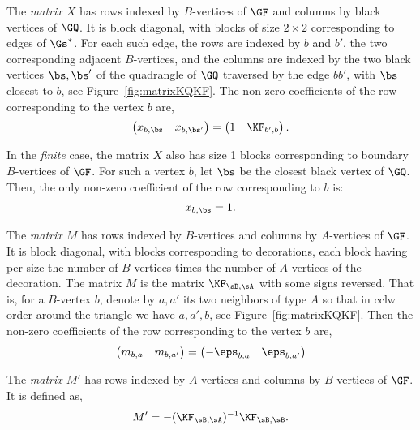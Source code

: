 \documentclass[a4paper,twoside,11pt]{article}
\begin{document}
The \emph{matrix $X$} has rows indexed by $B$-vertices of $\GF$ and columns by black vertices of $\GQ$.
It is block diagonal, with blocks of size $2\times 2$ corresponding to edges of $\Gs^*$. For each such edge, the 
rows are indexed by $b$ and $b'$, the two corresponding adjacent $B$-vertices, and the
columns are indexed by the two black vertices $\bs,\bs'$ of the quadrangle of $\GQ$ traversed by the edge $bb'$, with $\bs$ closest 
to $b$, see Figure~\ref{fig:matrixKQKF}. 
The non-zero coefficients of the row corresponding to the vertex $b$ are,
\begin{equation*}
\begin{pmatrix}
x_{b,\bs}&x_{b,\bs'} 
\end{pmatrix}
=
\begin{pmatrix}
1&\KF_{b',b}
\end{pmatrix}.
\end{equation*}

In the \emph{finite} case, the matrix $X$ also has size 1 blocks corresponding to boundary $B$-vertices of $\GF$. For such a vertex 
$b$, let $\bs$ be the closest black vertex of $\GQ$. Then, the only non-zero coefficient of the row corresponding to $b$ is:
\begin{align*}
x_{b,\bs}=1.
\end{align*}


The \emph{matrix $M$} has rows indexed by $B$-vertices and columns by $A$-vertices of $\GF$. It is block diagonal, with blocks 
corresponding to decorations, each block having per size the number of $B$-vertices times the number of $A$-vertices of the decoration.
The matrix $M$ is the matrix $\KF_{\sB,\sA}$ with some signs reversed. That is,
for a $B$-vertex $b$, denote by $a,a'$ its two neighbors of type $A$ so that in cclw order around the triangle we have $a,a',b$, see 
Figure~\ref{fig:matrixKQKF}. Then the non-zero coefficients of the row corresponding to the vertex $b$ are,
\begin{equation*}
\begin{pmatrix}
m_{b,a}&m_{b,a'} 
\end{pmatrix}
=
\begin{pmatrix}
-\eps_{b,a}&\eps_{b,a'}
\end{pmatrix}
\end{equation*}

The \emph{matrix $M'$} has rows indexed by $A$-vertices and columns by $B$-vertices of $\GF$. It is defined as,
\[
M'=-(\KF_{\sB,\sA})^{-1}\KF_{\sB,\sB}.
\]
\end{document}
